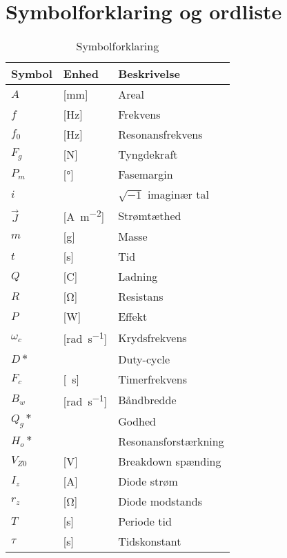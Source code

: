 \chapter{Symbolforklaring og ordliste} \label{bilag:symbol_ordliste}

\begin{table}[h!]
\centering
\caption{Symbolforklaring}
\label{tab:symboler}
\begin{threeparttable}
\begin{tabular}{l l l}
\toprule
\multicolumn{1}{l}{Symbol}       &
\multicolumn{1}{l}{Enhed}        &
\multicolumn{1}{l}{Beskrivelse}  \\ 
\midrule
$A$					&	[\si{\milli\meter}]			& Areal 		\\
$f$					&	[\si{\hertz}]				& Frekvens		\\
$f_0$				&	[\si{\hertz}] 				& Resonansfrekvens \\
$F_g$				&	[\si{\newton}]				& Tyngdekraft	\\
$P_{m}$				&	[\si{\degree}]				& Fasemargin	\\
$i$\tnote{*}		&								& $\sqrt{-1}$ imaginær tal	\\
$\vec{J}$			&	[\si{\ampere\per\meter\squared}]		& Strømtæthed	\\
$m$			  		&	[\si{\gram}] 				& Masse \\
$t$			  		&	[\si{\second}] 				& Tid \\
$Q$					&	[\si{\coulomb}] 			& Ladning \\
$R$					&	[\si{\ohm}] 				& Resistans \\
$P$					&	[\si{\watt}] 				& Effekt \\
$\omega_{c}$		&	[\si{\radian\per\second}]	& Krydsfrekvens	\\
$D*$				&								& Duty-cycle\\
$F_c$				&	[\si{\per\second}]			& Timerfrekvens\\
$B_w$				&	[\si{\radian\per\second}]	& Båndbredde\\
$Q_g*$				&								& Godhed\\
$H_o*$				&								& Resonansforstærkning\\
$V_{Z0}$			&	[\si{\volt}]				& Breakdown spænding\\
$I_z$				&	[\si{\ampere}]				& Diode strøm\\
$r_z$				&	[\si{\ohm}]					& Diode modstands\\
$T$					&	[\si{\second}]				& Periode tid\\
$\tau$				&	[\si{\second}]				& Tidskonstant\\

\end{tabular}
\end{threeparttable}
\end{table}
